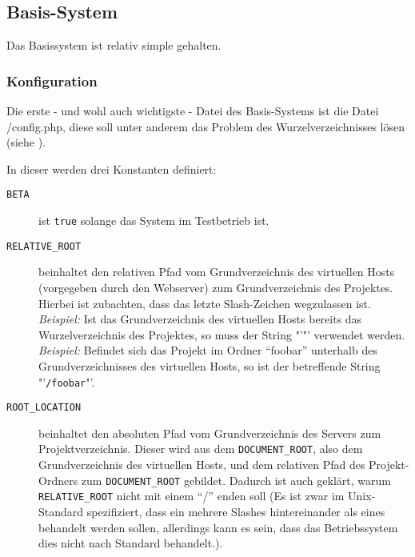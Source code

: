 \subsection{Basis-System}
Das Basissystem ist relativ simple gehalten.\\
\subsubsection{Konfiguration}
Die erste - und wohl auch wichtigste - Datei des Basis-Systems ist die Datei /config.php, diese soll unter anderem das Problem des Wurzelverzeichnisses lösen (siehe ).

In dieser werden drei Konstanten definiert:
\begin{description}
	\item[\texttt{BETA}] ist \texttt{true} solange das System im Testbetrieb ist.
	\item[\texttt{RELATIVE\_ROOT}] beinhaltet den relativen Pfad vom Grundverzeichnis des virtuellen Hosts (vorgegeben durch den Webserver) zum Grundverzeichnis des Projektes. Hierbei ist zubachten, dass das letzte Slash-Zeichen wegzulassen ist.\\
	\textit{Beispiel:} Ist das Grundverzeichnis des virtuellen Hosts bereits das Wurzelverzeichnis des Projektes, so muss der String "'"' verwendet werden.\\
	\textit{Beispiel:} Befindet sich das Projekt im Ordner \enquote{foobar} unterhalb des Grundverzeichnisses des virtuellen Hosts, so ist der betreffende String "'\texttt{/foobar}"'.
	\item[\texttt{ROOT\_LOCATION}] beinhaltet den absoluten Pfad vom Grundverzeichnis des Servers zum Projektverzeichnis. Dieser wird aus dem \texttt{DOCUMENT\_ROOT}, also dem Grundverzeichnis des virtuellen Hosts, und dem relativen Pfad des Projekt-Ordners zum \texttt{DOCUMENT\_ROOT} gebildet. Dadurch ist auch geklärt, warum \texttt{RELATIVE\_ROOT} nicht mit einem \enquote{/} enden soll (Es ist zwar im Unix-Standard spezifiziert, dass ein mehrere Slashes hintereinander als eines behandelt werden sollen, allerdings kann es sein, dass das Betriebssystem dies nicht nach Standard behandelt.).
\end{description}

